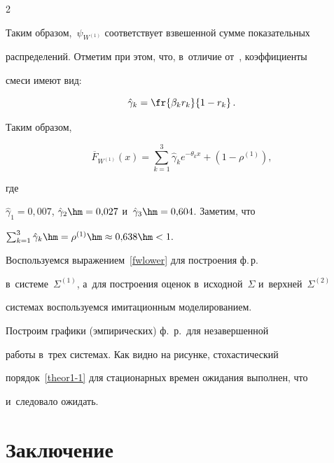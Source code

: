 \begin{multicols}{2}
\noindent


Таким образом,~$\psi_{W^{(1)}}$ соответствует взвешенной  сумме показательных 


распределений. Отметим при этом, что, в~отличие от~\cite{rego}, коэффициенты 


смеси имеют вид:


$$


\hat\gamma_k=\fr{\beta_k r_k}{1-r_k}\,.


$$


Таким образом,


\begin{equation}


\label{fwlower}


\overline F_{W^{(1)}}(x)=\sum\limits_{k=1}^3 \hat\gamma_k e^{-\theta_k x} + \left(1- \rho^{(1)}\right),


\end{equation}


где


$\hat\gamma_1=0{,}007$, $\hat\gamma_2\hm=0{,}027$ и~$\hat\gamma_3\hm=0{,}604$. Заметим, что 


$\sum\nolimits_{k=1}^3 \hat\gamma_k\hm=\rho^{(1)}\hm\approx 0{,}638\hm <1.$





Воспользуемся выражением~\eqref{fwlower} для по\-стро\-ения ф.\,р.\ 


в~сис\-те\-ме~$\Sigma^{(1)}$, а~для по\-стро\-ения оценок в~исходной~$\Sigma$ и~верхней~$\Sigma^{(2)}$ 


сис\-те\-мах воспользуемся имитационным моделированием.


Построим графики (эмпирических) ф.~р.\ для незавершенной 


работы в~трех сис\-те\-мах. Как видно на рисунке, стохастический 


порядок~\eqref{theor1-1} для стационарных времен ожидания выполнен, что 


и~следовало ожидать.




















\section{Заключение}






\end{multicols}
